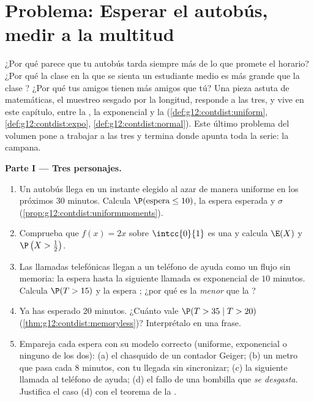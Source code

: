 \section{Problema: Esperar el autobús, medir a la multitud}

\begin{problem}
\label{pb:g12:contdist:1}
¿Por qué parece que tu autobús tarda siempre más de lo que promete el
horario? ¿Por qué la clase en la que se sienta un estudiante medio es más
grande que la clase ? ¿Por qué tus amigos tienen más amigos que tú?
Una pieza astuta de matemáticas, el muestreo sesgado por la longitud,
responde a las tres, y vive en este capítulo, entre la , la exponencial y la  (\cref{def:g12:contdist:uniform},
\cref{def:g12:contdist:expo}, \cref{def:g12:contdist:normal}). Este último
problema del volumen pone a trabajar a las tres  y termina donde
apunta toda la serie: la campana.

\medskip
\noindent\textbf{Parte I --- Tres personajes.}
\begin{enumerate}
  \item Un autobús llega en un instante elegido al azar de manera uniforme
        en los próximos $30$ minutos. Calcula
        $\P(\text{espera} \leq 10)$, la espera esperada y $\sigma$
        (\cref{prop:g12:contdist:uniformmoments}).
  \item Comprueba que $f(x) = 2x$ sobre $\intcc{0}{1}$ es una  y
        calcula $\E(X)$ y $\P\left(X > \frac12\right)$.
  \item Las llamadas telefónicas llegan a un teléfono de ayuda como un
        flujo sin memoria: la espera hasta la siguiente llamada es
        exponencial de  $10$ minutos. Calcula $\P(T > 15)$ y la espera
        ; ¿por qué es la  \emph{menor} que la ?
  \item Ya has esperado $20$ minutos. ¿Cuánto vale
        $\P(T > 35 \mid T > 20)$ (\cref{thm:g12:contdist:memoryless})?
        Interprétalo en una frase.
  \item Empareja cada espera con su modelo correcto (uniforme, exponencial
        o ninguno de los dos): (a) el chasquido de un contador Geiger; (b)
        un metro que pasa cada $8$ minutos, con tu llegada sin
        sincronizar; (c) la siguiente llamada al teléfono de ayuda; (d) el
        fallo de una bombilla que \emph{se desgasta}. Justifica el caso (d)
        con el teorema de la .
\end{enumerate}


\end{problem}
